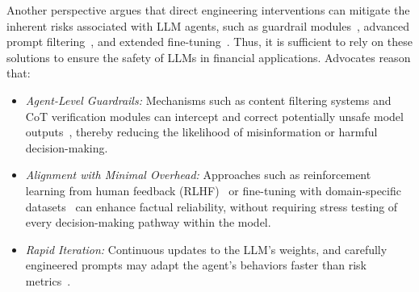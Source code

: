 Another perspective argues that direct engineering interventions can mitigate the inherent risks associated with LLM agents, such as guardrail modules~\citep{chu2024causal}, advanced prompt filtering~\citep{gao2024brief}, and extended fine-tuning~\citep{qi2024finetuning}. Thus, it is sufficient to rely on these solutions to ensure the safety of LLMs in financial applications. Advocates reason that:
\vspace{-5pt}
\begin{itemize}
    \item \emph{Agent-Level Guardrails:} 
    Mechanisms such as content filtering systems and CoT verification modules can intercept and correct potentially unsafe model outputs~\citep{ling2023deductive}, thereby reducing the likelihood of misinformation or harmful decision-making.
    \item \emph{Alignment with Minimal Overhead:} 
    Approaches such as reinforcement learning from human feedback (RLHF)~\citep{ouyang2022training} or fine-tuning with domain-specific datasets~\citep{li2023large} can enhance factual reliability, without requiring stress testing of every decision-making pathway within the model.
    \item \emph{Rapid Iteration:} Continuous updates to the LLM's weights, and carefully engineered prompts may adapt the agent's behaviors faster than risk metrics~\citep{chen2023unleashing}. 
    
\end{itemize}

